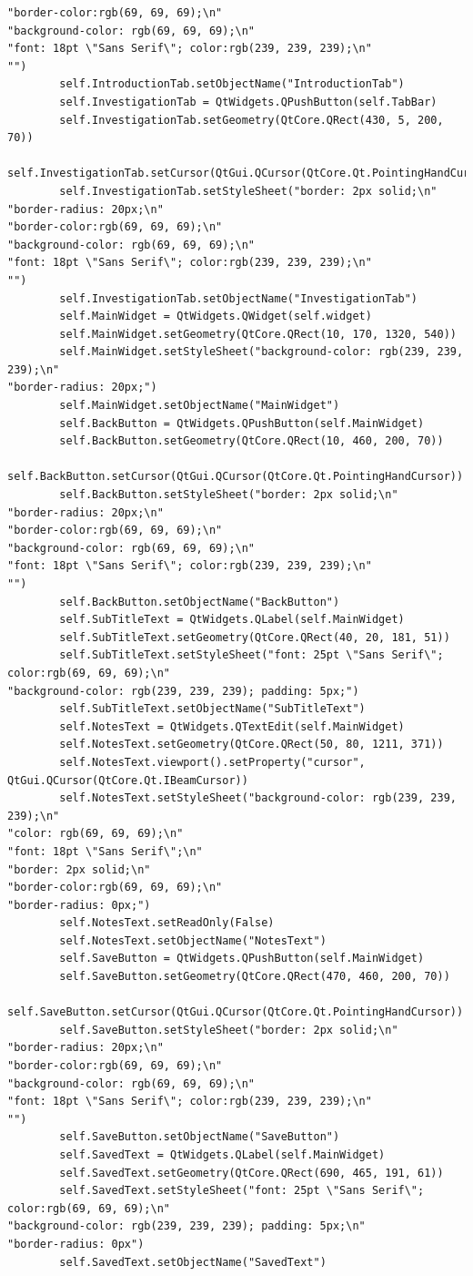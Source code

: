 \documentclass[12pt]{article}
\begin{document}
\begin{lstlisting}
"border-color:rgb(69, 69, 69);\n"
"background-color: rgb(69, 69, 69);\n"
"font: 18pt \"Sans Serif\"; color:rgb(239, 239, 239);\n"
"")
        self.IntroductionTab.setObjectName("IntroductionTab")
        self.InvestigationTab = QtWidgets.QPushButton(self.TabBar)
        self.InvestigationTab.setGeometry(QtCore.QRect(430, 5, 200, 70))
        self.InvestigationTab.setCursor(QtGui.QCursor(QtCore.Qt.PointingHandCursor))
        self.InvestigationTab.setStyleSheet("border: 2px solid;\n"
"border-radius: 20px;\n"
"border-color:rgb(69, 69, 69);\n"
"background-color: rgb(69, 69, 69);\n"
"font: 18pt \"Sans Serif\"; color:rgb(239, 239, 239);\n"
"")
        self.InvestigationTab.setObjectName("InvestigationTab")
        self.MainWidget = QtWidgets.QWidget(self.widget)
        self.MainWidget.setGeometry(QtCore.QRect(10, 170, 1320, 540))
        self.MainWidget.setStyleSheet("background-color: rgb(239, 239, 239);\n"
"border-radius: 20px;")
        self.MainWidget.setObjectName("MainWidget")
        self.BackButton = QtWidgets.QPushButton(self.MainWidget)
        self.BackButton.setGeometry(QtCore.QRect(10, 460, 200, 70))
        self.BackButton.setCursor(QtGui.QCursor(QtCore.Qt.PointingHandCursor))
        self.BackButton.setStyleSheet("border: 2px solid;\n"
"border-radius: 20px;\n"
"border-color:rgb(69, 69, 69);\n"
"background-color: rgb(69, 69, 69);\n"
"font: 18pt \"Sans Serif\"; color:rgb(239, 239, 239);\n"
"")
        self.BackButton.setObjectName("BackButton")
        self.SubTitleText = QtWidgets.QLabel(self.MainWidget)
        self.SubTitleText.setGeometry(QtCore.QRect(40, 20, 181, 51))
        self.SubTitleText.setStyleSheet("font: 25pt \"Sans Serif\"; color:rgb(69, 69, 69);\n"
"background-color: rgb(239, 239, 239); padding: 5px;")
        self.SubTitleText.setObjectName("SubTitleText")
        self.NotesText = QtWidgets.QTextEdit(self.MainWidget)
        self.NotesText.setGeometry(QtCore.QRect(50, 80, 1211, 371))
        self.NotesText.viewport().setProperty("cursor", QtGui.QCursor(QtCore.Qt.IBeamCursor))
        self.NotesText.setStyleSheet("background-color: rgb(239, 239, 239);\n"
"color: rgb(69, 69, 69);\n"
"font: 18pt \"Sans Serif\";\n"
"border: 2px solid;\n"
"border-color:rgb(69, 69, 69);\n"
"border-radius: 0px;")
        self.NotesText.setReadOnly(False)
        self.NotesText.setObjectName("NotesText")
        self.SaveButton = QtWidgets.QPushButton(self.MainWidget)
        self.SaveButton.setGeometry(QtCore.QRect(470, 460, 200, 70))
        self.SaveButton.setCursor(QtGui.QCursor(QtCore.Qt.PointingHandCursor))
        self.SaveButton.setStyleSheet("border: 2px solid;\n"
"border-radius: 20px;\n"
"border-color:rgb(69, 69, 69);\n"
"background-color: rgb(69, 69, 69);\n"
"font: 18pt \"Sans Serif\"; color:rgb(239, 239, 239);\n"
"")
        self.SaveButton.setObjectName("SaveButton")
        self.SavedText = QtWidgets.QLabel(self.MainWidget)
        self.SavedText.setGeometry(QtCore.QRect(690, 465, 191, 61))
        self.SavedText.setStyleSheet("font: 25pt \"Sans Serif\"; color:rgb(69, 69, 69);\n"
"background-color: rgb(239, 239, 239); padding: 5px;\n"
"border-radius: 0px")
        self.SavedText.setObjectName("SavedText")


\end{lstlisting}
\end{document}
